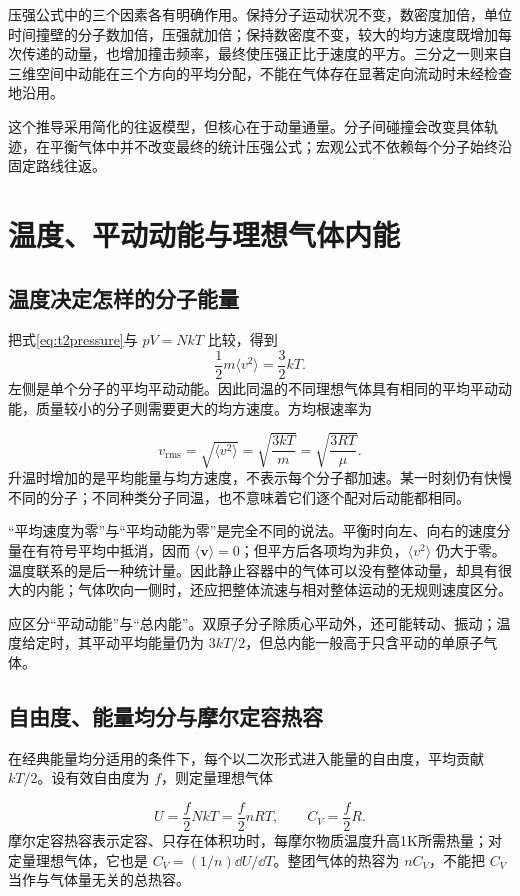 压强公式中的三个因素各有明确作用。保持分子运动状况不变，数密度加倍，单位时间撞壁的分子数加倍，压强就加倍；保持数密度不变，较大的均方速度既增加每次传递的动量，也增加撞击频率，最终使压强正比于速度的平方。三分之一则来自三维空间中动能在三个方向的平均分配，不能在气体存在显著定向流动时未经检查地沿用。

这个推导采用简化的往返模型，但核心在于动量通量。分子间碰撞会改变具体轨迹，在平衡气体中并不改变最终的统计压强公式；宏观公式不依赖每个分子始终沿固定路线往返。

\section{温度、平动动能与理想气体内能}
\subsection{温度决定怎样的分子能量}
把式\eqref{eq:t2pressure}与 $pV=NkT$ 比较，得到
\[\frac12m\langle v^2\rangle=\frac32kT.\]
左侧是单个分子的平均平动动能。因此同温的不同理想气体具有相同的平均平动动能，质量较小的分子则需要更大的均方速度。方均根速率为

\[\boxed{v_{\mathrm{rms}}=\sqrt{\langle v^2\rangle}=\sqrt{\frac{3kT}{m}}=\sqrt{\frac{3RT}{\mu}}}.\]
升温时增加的是平均能量与均方速度，不表示每个分子都加速。某一时刻仍有快慢不同的分子；不同种类分子同温，也不意味着它们逐个配对后动能都相同。

“平均速度为零”与“平均动能为零”是完全不同的说法。平衡时向左、向右的速度分量在有符号平均中抵消，因而 $\langle\bm v\rangle=0$；但平方后各项均为非负，$\langle v^2\rangle$ 仍大于零。温度联系的是后一种统计量。因此静止容器中的气体可以没有整体动量，却具有很大的内能；气体吹向一侧时，还应把整体流速与相对整体运动的无规则速度区分。

应区分“平动动能”与“总内能”。双原子分子除质心平动外，还可能转动、振动；温度给定时，其平动平均能量仍为 $3kT/2$，但总内能一般高于只含平动的单原子气体。


\subsection{自由度、能量均分与摩尔定容热容}
在经典能量均分适用的条件下，每个以二次形式进入能量的自由度，平均贡献 $kT/2$。设有效自由度为 $f$，则定量理想气体

\[U=\frac f2NkT=\frac f2nRT,\qquad C_V=\frac f2R.\]
摩尔定容热容表示定容、只存在体积功时，每摩尔物质温度升高1K所需热量；对定量理想气体，它也是 $C_V=(1/n)\dd U/\dd T$。整团气体的热容为 $nC_V$，不能把 $C_V$ 当作与气体量无关的总热容。

